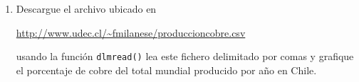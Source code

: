 \documentclass[11pt]{article}
\begin{document}
\begin{enumerate}
\item Descargue el archivo ubicado en 
\begin{center}
\url{http://www.udec.cl/~fmilanese/produccioncobre.csv}
\end{center}
usando la funci\'on \texttt{dlmread()} lea este fichero delimitado por comas y grafique el porcentaje de cobre del total mundial producido por a\~no en Chile.

\end{enumerate}
\end{document}
